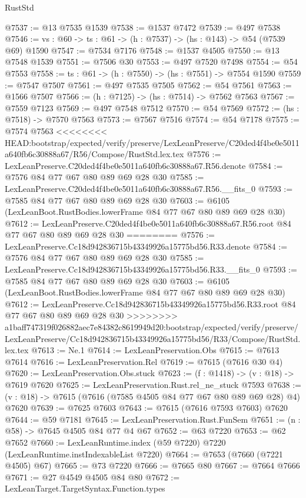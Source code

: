 \begin{lexlean}{RustStd}
\begin{coremodule}
{\begin{coremodule}
{{{{{{{{{{{{@7537 := @13 @7535 @1539
@7538 := @1537 @7472
@7539 := @497 @7538
@7546 := {vs : @60} -> {ts : @61} -> (h : @7537) -> (hs : @143) -> @54 (@7539 @69) @1590
@7547 := @7534 @7176
@7548 := @1537 @4505
@7550 := @13 @7548 @1539
@7551 := @7506 @30
@7553 := @497 @7520 @7498
@7554 := @54 @7553
@7558 := {ts : @61} -> (h : @7550) -> (hs : @7551) -> @7554 @1590
@7559 := @7547 @7507
@7561 := @497 @7535 @7505
@7562 := @54 @7561
@7563 := @1566 @7507
@7566 := (h : @7125) -> (hs : @7514) -> @7562 @7563
@7567 := @7559 @7123
@7569 := @497 @7548 @7512
@7570 := @54 @7569
@7572 := (hs : @7518) -> @7570 @7563
@7573 := @7567 @7516
@7574 := @54 @7178
@7575 := @7574 @7563
<<<<<<<< HEAD:bootstrap/expected/verify/preserve/LexLeanPreserve/C20ded4f4be0e5011a640fb6c30888a67/R56/Compose/RustStd.lex.tex
@7576 := LexLeanPreserve.C20ded4f4be0e5011a640fb6c30888a67.R56.denote
@7584 := @7576 @84 @77 @67 @80 @89 @69 @28 @30
@7585 := LexLeanPreserve.C20ded4f4be0e5011a640fb6c30888a67.R56.__fits_0
@7593 := @7585 @84 @77 @67 @80 @89 @69 @28 @30
@7603 := @6105 (LexLeanBoot.RustBodies.lowerFrame @84 @77 @67 @80 @89 @69 @28 @30)
@7612 := LexLeanPreserve.C20ded4f4be0e5011a640fb6c30888a67.R56.root @84 @77 @67 @80 @89 @69 @28 @30
========
@7576 := LexLeanPreserve.Cc18d942836715b43349926a15775bd56.R33.denote
@7584 := @7576 @84 @77 @67 @80 @89 @69 @28 @30
@7585 := LexLeanPreserve.Cc18d942836715b43349926a15775bd56.R33.__fits_0
@7593 := @7585 @84 @77 @67 @80 @89 @69 @28 @30
@7603 := @6105 (LexLeanBoot.RustBodies.lowerFrame @84 @77 @67 @80 @89 @69 @28 @30)
@7612 := LexLeanPreserve.Cc18d942836715b43349926a15775bd56.R33.root @84 @77 @67 @80 @89 @69 @28 @30
>>>>>>>> a1baff747319f026882aec7e84382c8619949d20:bootstrap/expected/verify/preserve/LexLeanPreserve/Cc18d942836715b43349926a15775bd56/R33/Compose/RustStd.lex.tex
@7613 := Ne.{1}
@7614 := LexLeanPreservation.Obs
@7615 := @7613 @7614
@7616 := LexLeanPreservation.Rel
@7619 := @7615 (@7616 @30 @4)
@7620 := LexLeanPreservation.Obs.stuck
@7623 := (f : @1418) -> (v : @18) -> @7619 @7620
@7625 := LexLeanPreservation.Rust.rel_ne_stuck @7593
@7638 := (v : @18) -> @7615 (@7616 (@7585 @4505 @84 @77 @67 @80 @89 @69 @28) @4) @7620
@7639 := @7625 @7603
@7643 := @7615 (@7616 @7593 @7603) @7620
@7644 := @59 @7181
@7645 := LexLeanPreservation.Rust.FunSem
@7651 := (n : @58) -> @7645 @4505 @84 @77 @4 @67
@7652 := @63 @7220
@7653 := @62 @7652
@7660 := LexLeanRuntime.index (@59 @7220) @7220 (LexLeanRuntime.instIndexableList @7220)
@7664 := @7653 (@7660 (@7221 @4505) @67)
@7665 := @73 @7220
@7666 := @7665 @80
@7667 := @7664 @7666
@7671 := @27 @4549 @4505 @84 @80
@7672 := LexLeanTarget.TargetSyntax.Function.types
}}}}}}}}}}}}
\end{coremodule}}
\end{coremodule}
\end{lexlean}
